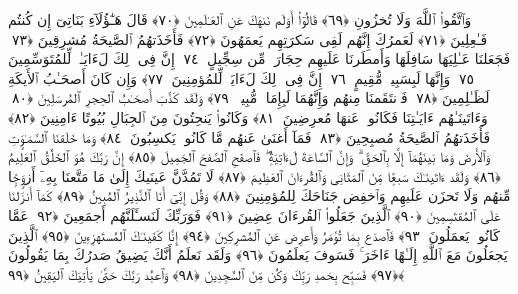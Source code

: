  وَٱتَّقُوا۟ ٱللَّهَ وَلَا تُخزُونِ ﴿٦٩﴾
 قَالُوٓا۟ أَوَلَم نَنهَكَ عَنِ ٱلعَـٰلَمِينَ ﴿٧٠﴾
 قَالَ هَـٰٓؤُلَآءِ بَنَاتِىٓ إِن كُنتُم فَـٰعِلِينَ ﴿٧١﴾
 لَعَمرُكَ إِنَّهُم لَفِى سَكرَتِهِم يَعمَهُونَ ﴿٧٢﴾
 فَأَخَذَتهُمُ ٱلصَّيحَةُ مُشرِقِينَ ﴿٧٣﴾
 فَجَعَلنَا عَـٰلِيَهَا سَافِلَهَا وَأَمطَرنَا عَلَيهِم حِجَارَةًۭ مِّن سِجِّيلٍ ﴿٧٤﴾
 إِنَّ فِى ذَٟلِكَ لَءَايَـٰتٍۢ لِّلمُتَوَسِّمِينَ ﴿٧٥﴾
 وَإِنَّهَا لَبِسَبِيلٍۢ مُّقِيمٍ ﴿٧٦﴾
 إِنَّ فِى ذَٟلِكَ لَءَايَةًۭ لِّلمُؤمِنِينَ ﴿٧٧﴾
 وَإِن كَانَ أَصحَـٰبُ ٱلأَيكَةِ لَظَـٰلِمِينَ ﴿٧٨﴾
 فَٱنتَقَمنَا مِنهُم وَإِنَّهُمَا لَبِإِمَامٍۢ مُّبِينٍۢ ﴿٧٩﴾
 وَلَقَد كَذَّبَ أَصحَـٰبُ ٱلحِجرِ ٱلمُرسَلِينَ ﴿٨٠﴾
 وَءَاتَينَـٰهُم ءَايَـٰتِنَا فَكَانُوا۟ عَنهَا مُعرِضِينَ ﴿٨١﴾
 وَكَانُوا۟ يَنحِتُونَ مِنَ ٱلجِبَالِ بُيُوتًا ءَامِنِينَ ﴿٨٢﴾
 فَأَخَذَتهُمُ ٱلصَّيحَةُ مُصبِحِينَ ﴿٨٣﴾
 فَمَآ أَغنَىٰ عَنهُم مَّا كَانُوا۟ يَكسِبُونَ ﴿٨٤﴾
 وَمَا خَلَقنَا ٱلسَّمَـٰوَٟتِ وَٱلأَرضَ وَمَا بَينَهُمَآ إِلَّا بِٱلحَقِّ ۗ وَإِنَّ ٱلسَّاعَةَ لَءَاتِيَةٌۭ ۖ فَٱصفَحِ ٱلصَّفحَ ٱلجَمِيلَ ﴿٨٥﴾
 إِنَّ رَبَّكَ هُوَ ٱلخَلَّٰقُ ٱلعَلِيمُ ﴿٨٦﴾
 وَلَقَد ءَاتَينَـٰكَ سَبعًۭا مِّنَ ٱلمَثَانِى وَٱلقُرءَانَ ٱلعَظِيمَ ﴿٨٧﴾
 لَا تَمُدَّنَّ عَينَيكَ إِلَىٰ مَا مَتَّعنَا بِهِۦٓ أَزوَٟجًۭا مِّنهُم وَلَا تَحزَن عَلَيهِم وَٱخفِض جَنَاحَكَ لِلمُؤمِنِينَ ﴿٨٨﴾
 وَقُل إِنِّىٓ أَنَا ٱلنَّذِيرُ ٱلمُبِينُ ﴿٨٩﴾
 كَمَآ أَنزَلنَا عَلَى ٱلمُقتَسِمِينَ ﴿٩٠﴾
 ٱلَّذِينَ جَعَلُوا۟ ٱلقُرءَانَ عِضِينَ ﴿٩١﴾
 فَوَرَبِّكَ لَنَسـَٔلَنَّهُم أَجمَعِينَ ﴿٩٢﴾
 عَمَّا كَانُوا۟ يَعمَلُونَ ﴿٩٣﴾
 فَٱصدَع بِمَا تُؤمَرُ وَأَعرِض عَنِ ٱلمُشرِكِينَ ﴿٩٤﴾
 إِنَّا كَفَينَـٰكَ ٱلمُستَهزِءِينَ ﴿٩٥﴾
 ٱلَّذِينَ يَجعَلُونَ مَعَ ٱللَّهِ إِلَـٰهًا ءَاخَرَ ۚ فَسَوفَ يَعلَمُونَ ﴿٩٦﴾
 وَلَقَد نَعلَمُ أَنَّكَ يَضِيقُ صَدرُكَ بِمَا يَقُولُونَ ﴿٩٧﴾
 فَسَبِّح بِحَمدِ رَبِّكَ وَكُن مِّنَ ٱلسَّٰجِدِينَ ﴿٩٨﴾
 وَٱعبُد رَبَّكَ حَتَّىٰ يَأتِيَكَ ٱليَقِينُ ﴿٩٩﴾
 
